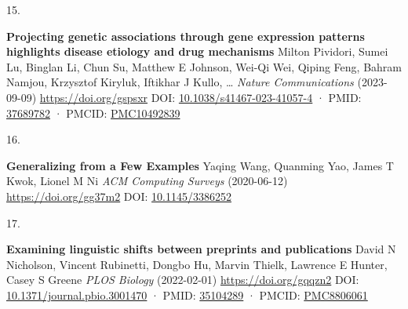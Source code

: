 \documentclass[
]{article}
\newlength{\cslhangindent}
\newlength{\csllabelwidth}
\newlength{\cslentryspacingunit} %
\newenvironment{CSLReferences}[2] %
 {%
  \setlength{\parindent}{0pt}
  \ifodd #1
  \let\oldpar\par
  \def\par{\hangindent=\cslhangindent\oldpar}
  \fi
  \setlength{\parskip}{#2\cslentryspacingunit}
 }%
 {}
\newcommand{\CSLBlock}[1]{#1\hfill\break}
\newcommand{\CSLLeftMargin}[1]{\parbox[t]{\csllabelwidth}{#1}}
\newcommand{\CSLRightInline}[1]{\parbox[t]{\linewidth - \csllabelwidth}{#1}\break}
\providecommand{\DIFaddbegin}{} %
\providecommand{\DIFaddend}{} %
\providecommand{\DIFdelbegin}{} %
\providecommand{\DIFdelend}{} %
\newcommand{\DIFscaledelfig}{0.5}
\newlength{\DIFdelgraphicswidth} %
\newlength{\DIFdelgraphicsheight} %
\newcommand{\DIFaddincludegraphics}[2][]{{\color{blue}\fbox{\DIFOincludegraphics[#1]{#2}}}} %
\newcommand{\DIFdelincludegraphics}[2][]{%
\sbox{\DIFdelgraphicsbox}{\DIFOincludegraphics[#1]{#2}}%
\settoboxwidth{\DIFdelgraphicswidth}{\DIFdelgraphicsbox} %
\settoboxtotalheight{\DIFdelgraphicsheight}{\DIFdelgraphicsbox} %
\scalebox{\DIFscaledelfig}{%
\parbox[b]{\DIFdelgraphicswidth}{\usebox{\DIFdelgraphicsbox}\\[-\baselineskip] \rule{\DIFdelgraphicswidth}{0em}}\llap{\resizebox{\DIFdelgraphicswidth}{\DIFdelgraphicsheight}{%
\setlength{\unitlength}{\DIFdelgraphicswidth}%
\begin{picture}(1,1)%
\thicklines\linethickness{2pt} %
{\color[rgb]{1,0,0}\put(0,0){\framebox(1,1){}}}%
{\color[rgb]{1,0,0}\put(0,0){\line( 1,1){1}}}%
{\color[rgb]{1,0,0}\put(0,1){\line(1,-1){1}}}%
\end{picture}%
}\hspace*{3pt}}} %
} %
\DeclareRobustCommand{\DIFaddbegin}{\DIFOaddbegin \let\includegraphics\DIFaddincludegraphics} %
\DeclareRobustCommand{\DIFaddend}{\DIFOaddend \let\includegraphics\DIFOincludegraphics} %
\DeclareRobustCommand{\DIFdelbegin}{\DIFOdelbegin \let\includegraphics\DIFdelincludegraphics} %
\DeclareRobustCommand{\DIFdelend}{\DIFOaddend \let\includegraphics\DIFOincludegraphics} %
\begin{document}
\begin{CSLReferences}{0}{0}
\leavevmode\vadjust pre{\DIFdelbegin %
\DIFdelend \DIFaddbegin \hypertarget{ref-NM3rHx1i}{}\DIFaddend }%
\DIFdelbegin %
\DIFdelend \DIFaddbegin \CSLLeftMargin{15. }\DIFaddend %
\DIFdelbegin %
\DIFdelend \DIFaddbegin \CSLRightInline{\textbf{Projecting genetic associations through gene expression patterns highlights disease etiology and drug mechanisms}
\CSLBlock{Milton Pividori, Sumei Lu, Binglan Li, Chun Su, Matthew E Johnson, Wei-Qi Wei, Qiping Feng, Bahram Namjou, Krzysztof Kiryluk, Iftikhar J Kullo, \ldots{} } \emph{Nature Communications} (2023-09-09) \url{https://doi.org/gspsxr}
\CSLBlock{DOI: \href{https://doi.org/10.1038/s41467-023-41057-4}{10.1038/s41467-023-41057-4} · PMID: \href{https://www.ncbi.nlm.nih.gov/pubmed/37689782}{37689782} · PMCID: \href{https://www.ncbi.nlm.nih.gov/pmc/articles/PMC10492839}{PMC10492839}}}
\DIFaddend 

\leavevmode{}%
\DIFdelbegin %
\DIFdelend \DIFaddbegin \CSLLeftMargin{16. }\DIFaddend %
\CSLRightInline{\textbf{Generalizing from a Few Examples}
\CSLBlock{Yaqing Wang, Quanming Yao, James T Kwok, Lionel M Ni} \emph{ACM Computing Surveys} (2020-06-12) \url{https://doi.org/gg37m2}
\CSLBlock{DOI: \href{https://doi.org/10.1145/3386252}{10.1145/3386252}}}

\leavevmode{}%
\DIFdelbegin %
\DIFdelend \DIFaddbegin \CSLLeftMargin{17. }\DIFaddend %
\CSLRightInline{\textbf{Examining linguistic shifts between preprints and publications}
\CSLBlock{David N Nicholson, Vincent Rubinetti, Dongbo Hu, Marvin Thielk, Lawrence E Hunter, Casey S Greene} \emph{PLOS Biology} (2022-02-01) \url{https://doi.org/gqqzn2}
\CSLBlock{DOI: \href{https://doi.org/10.1371/journal.pbio.3001470}{10.1371/journal.pbio.3001470} · PMID: \href{https://www.ncbi.nlm.nih.gov/pubmed/35104289}{35104289} · PMCID: \href{https://www.ncbi.nlm.nih.gov/pmc/articles/PMC8806061}{PMC8806061}}}


\end{CSLReferences}
\end{document}
